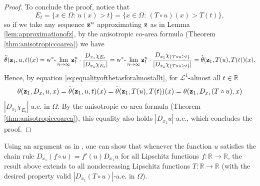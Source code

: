 \documentclass[reqno,12pt]{amsart}
\def\z{{\bf z}}
\def\R{\mathbb R}
\numberwithin{equation}{section}
\begin{document}
\begin{proof}
To conclude the proof, notice that
\begin{equation*}
E_t = \{ x \in \Omega: \, u(x) > t \} = \{ x \in \Omega: \, (T \circ u)(x) > T(t) \},
\end{equation*}
so if we take any sequence $\z^n$ approximating $\z$ as in Lemma \ref{lem:approximationofz}, by the anisotropic co-area formula (Theorem \ref{thm:anisotropiccoarea}) we have
\begin{equation}
\widetilde{\theta}(\z_1,u,t)(x) = \mathrm{w}^*\mbox{-}\lim_{n \rightarrow \infty} \z_1^n \cdot \frac{D_{x_1} \chi_{E_t}}{|D_{x_1} \chi_{E_t}|} = \mathrm{w}^*\mbox{-}\lim_{n \rightarrow \infty} \z_1^n \cdot \frac{D_{x_1} \chi_{\{ T \circ u \geq t\}}}{|D_{x_1} \chi_{\{ T \circ u \geq t \}}|} = \widetilde{\theta}(\z_1,T(u),T(t))(x).
\end{equation}
Hence, by equation \eqref{eq:equalityofthetasforalmostallt}, for $\mathcal{L}^1$-almost all $t \in \mathbb{R}$
\begin{equation*}
\theta(\z_1, D_{x_1} u,x) = \widetilde{\theta}(\z_1,u,t)(x) = \widetilde{\theta}(\z_1,T(u),T(t))(x) = \theta(\z_1, D_{x_1}(T \circ u),x)
\end{equation*}
$|D_{x_1} \chi_{E_t}|$-a.e. in $\Omega$. By the anisotropic co-area formula (Theorem \ref{thm:anisotropiccoarea}), this equality also holds $|D_{x_1} u|$-a.e., which concludes the proof.
\end{proof}

Using an argument as in \cite[Proposition 2.7]{LS}, one can show that whenever the function $u$ satisfies the chain rule $D_{x_1} (f \circ u) = f'(u) D_{x_1} u$ for all Lipschitz functions $f: \R \rightarrow \R$, the result above extends to all nondecreasing Lipschitz functions $T: \R \rightarrow \R$ (with the desired property valid $|D_{x_1} (T \circ u)|$-a.e. in $\Omega$). 
\end{document}
